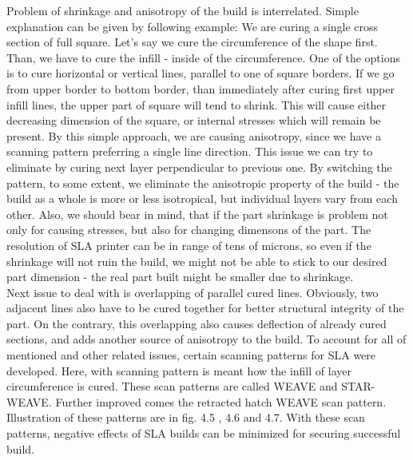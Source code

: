 \documentclass[a4paper, twoside, 11pt]{report}
\begin{document}
Problem of shrinkage and anisotropy of the build is interrelated. Simple explanation can be given by following example: We are curing a single cross section of full square. Let's say we cure the circumference of the shape first. Than, we have to cure the infill - inside of the circumference. One of the options is to cure horizontal or vertical lines, parallel to one of square borders. If we go from upper border to bottom border, than immediately after curing first upper infill lines, the upper part of square will tend to shrink. This will cause either decreasing dimension of the square, or internal stresses which will remain be present.  By this simple approach, we are causing anisotropy, since we have a scanning pattern preferring a single line direction. This issue we can try to eliminate by curing next layer perpendicular to previous one. By switching the pattern, to some extent, we eliminate the anisotropic property of the build - the build as a whole is more or less isotropical, but individual layers vary from each other. Also, we should bear in mind, that if the part shrinkage is problem not only for causing stresses, but also for changing dimensons of the part. The resolution of SLA printer can be in range of tens of microns, so even if the shrinkage will not ruin the build, we might not be able to stick to our desired part dimension - the real part built might be smaller due to shrinkage.\\
Next issue to deal with is overlapping of parallel cured lines. Obviously, two adjacent lines also have to be cured together for better structural integrity of the part. On the contrary, this overlapping also causes deflection of already cured sections, and adds another source of anisotropy to the build.
To account for all of mentioned and other related issues, certain scanning patterns for SLA were developed. Here, with scanning pattern is meant how the infill of layer circumference is cured. These scan patterns are called WEAVE and STAR-WEAVE. Further improved comes the retracted hatch WEAVE scan pattern. Illustration of these patterns are in fig. 4.5 , 4.6 and 4.7. With these scan patterns, negative effects of SLA builds can be minimized for securing successful build.

%
\end{document}
